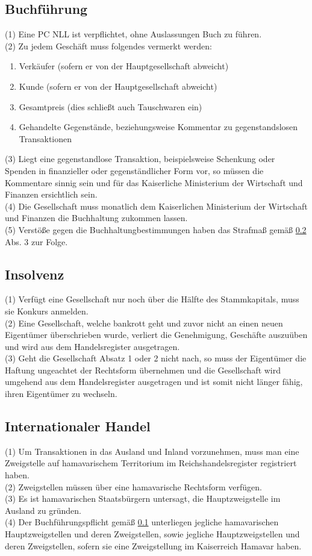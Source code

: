 \documentclass{article}
\begin{document}
\subsection{Buchführung}\label{buch}
(1) Eine PC NLL ist verpflichtet, ohne Auslassungen Buch zu führen.\\
(2) Zu jedem Geschäft muss folgendes vermerkt werden:
\begin{enumerate}
	\item Verkäufer (sofern er von der Hauptgesellschaft abweicht)
	\item Kunde (sofern er von der Hauptgesellschaft abweicht)
	\item Gesamtpreis (dies schließt auch Tauschwaren ein)
	\item Gehandelte Gegenstände, beziehungsweise Kommentar zu gegenstandslosen Transaktionen
\end{enumerate}
(3) Liegt eine gegenstandlose Transaktion, beispielsweise Schenkung oder Spenden in finanzieller oder gegenständlicher Form vor, so müssen die Kommentare sinnig sein und für das Kaiserliche Ministerium der Wirtschaft und Finanzen ersichtlich sein.\\
(4) Die Gesellschaft muss monatlich dem Kaiserlichen Ministerium der Wirtschaft und Finanzen die Buchhaltung zukommen lassen.\\
(5) Verstöße gegen die Buchhaltungbestimmungen haben das Strafmaß gemäß \ref{apored} Abs. 3 zur Folge.

\subsection{Insolvenz} \label{apored}
(1) Verfügt eine Gesellschaft nur noch über die Hälfte des Stammkapitals, muss sie Konkurs anmelden.\\
(2) Eine Gesellschaft, welche bankrott geht und zuvor nicht an einen neuen Eigentümer überschrieben wurde, verliert die Genehmigung, Geschäfte auszuüben und wird aus dem Handelsregister ausgetragen.\\
(3) Geht die Gesellschaft Absatz 1 oder 2 nicht nach, so muss der Eigentümer die Haftung ungeachtet der Rechtsform übernehmen und die Gesellschaft wird umgehend aus dem Handelsregister ausgetragen und ist somit nicht länger fähig, ihren Eigentümer zu wechseln.\\

\subsection{Internationaler Handel}
(1) Um Transaktionen in das Ausland und Inland vorzunehmen, muss man eine Zweigstelle auf hamavarischem Territorium im Reichshandelsregister registriert haben.\\
(2) Zweigstellen müssen über eine hamavarische Rechtsform verfügen.\\
(3) Es ist hamavarischen Staatsbürgern untersagt, die Hauptzweigstelle im Ausland zu gründen.\\
(4) Der Buchführungspflicht gemäß \ref{buch} unterliegen jegliche hamavarischen Hauptzweigstellen und deren Zweigstellen, sowie jegliche Hauptzweigstellen und deren Zweigstellen, sofern sie eine Zweigstellung im Kaiserreich Hamavar haben.\\
\end{document}
